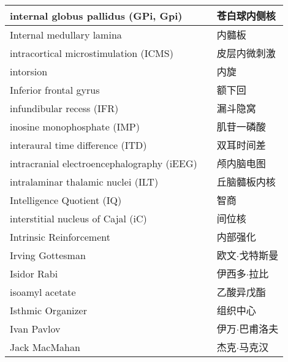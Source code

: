 \begin{longtable}{lll}
	\midrule
	internal globus pallidus (GPi, Gpi)  && 苍白球内侧核  \\
	
	\midrule
	Internal medullary lamina  && 内髓板  \\
	
	\midrule
	intracortical microstimulation (ICMS)  && 皮层内微刺激  \\
	
	\midrule
	intorsion   && 内旋  \\
	
	\midrule
	Inferior frontal gyrus   && 额下回  \\
	
	\midrule
	infundibular recess (IFR)   && 漏斗隐窝  \\
	
	\midrule
	inosine monophosphate (IMP)  && 肌苷一磷酸  \\
	
	\midrule
	interaural time difference (ITD)   && 双耳时间差  \\
	
	\midrule
	intracranial electroencephalography (iEEG)  && 颅内脑电图  \\
	
	\midrule
	intralaminar thalamic nuclei (ILT)  && 丘脑髓板内核  \\
	
	\midrule
	Intelligence Quotient (IQ)   && 智商  \\
	
	\midrule
	interstitial nucleus of Cajal (iC)   && 间位核  \\
	
	\midrule
	Intrinsic Reinforcement   && 内部强化  \\
	
	\midrule
	Irving Gottesman   && 欧文$\cdot$戈特斯曼  \\
	
	\midrule
	Isidor Rabi   && 伊西多$\cdot$拉比  \\
	
	\midrule
	isoamyl acetate   && 乙酸异戊酯  \\
	
	\midrule
	Isthmic Organizer   && 组织中心  \\
	
	\midrule
	Ivan Pavlov   && 伊万$\cdot$巴甫洛夫  \\
	
	\midrule
	Jack MacMahan   && 杰克$\cdot$马克汉  \\
	

\end{longtable}
